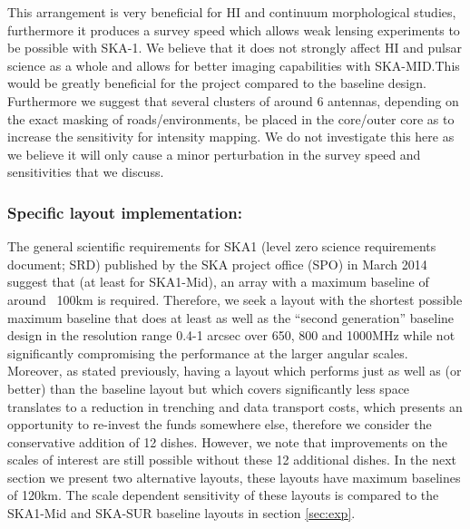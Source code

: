 \documentclass[sfheadings,a4paper,times,9pt,floats,floatfix]{article}
\begin{document}
This arrangement is very beneficial for HI and continuum morphological studies,
furthermore it produces a survey speed which allows weak lensing experiments to be
possible with SKA-1. We believe that it does not strongly affect HI and pulsar science as a whole and allows for
better imaging capabilities with SKA-MID.This would be greatly beneficial for the project
compared to the baseline design. Furthermore we suggest that several clusters of around 6
antennas, depending on the exact masking of roads/environments, be placed in the core/outer
core as to increase the sensitivity for intensity mapping. We do not
investigate this here as we believe it will only cause a minor perturbation in
the survey speed and sensitivities that we discuss.

\subsubsection{Specific layout implementation:}
The general scientific requirements for SKA1\cite{srd} (level zero science requirements document; SRD) published by the
SKA project office (SPO) in March 2014 suggest that (at least for
SKA1-Mid), an array with a maximum baseline of around ~100km is required. Therefore, we seek a layout with the shortest possible
maximum baseline that does at least as well as the ``second generation'' baseline design in the resolution range 0.4-1 arcsec over
650, 800 and 1000MHz while not significantly compromising the performance at the larger angular scales. Moreover, as stated
previously, having a layout which performs just as well as (or better) than the baseline layout but which covers significantly
less space translates to a reduction in trenching and data transport costs, which presents an opportunity to re-invest the funds
somewhere else, therefore we consider the conservative addition of 12 dishes. However, we note that improvements on the scales of
interest are still possible without these 12 additional dishes. In the next section we present two alternative
layouts, these layouts have maximum baselines of 120km. The scale dependent sensitivity of these layouts is
compared to the SKA1-Mid and SKA-SUR baseline layouts in section \ref{sec:exp}.
\end{document}
